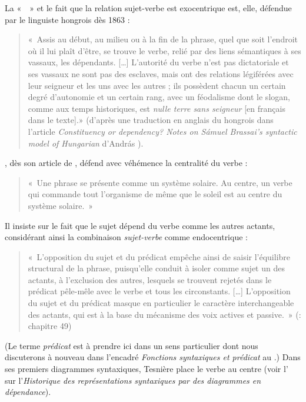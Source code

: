 {    La «~~» et le fait que la relation sujet-verbe est exocentrique est, elle, défendue par le linguiste hongrois  dès 1863 : 
    \begin{quote}«~Assis au début, au milieu ou à la fin de la phrase, quel que soit l’endroit où il lui plaît d’être, se trouve le verbe, relié par des liens sémantiques à ses vassaux, les dépendants. […] L’autorité du verbe n’est pas dictatoriale et ses vassaux ne sont pas des esclaves, mais ont des relations légiférées avec leur seigneur et les uns avec les autres ; ils possèdent chacun un certain degré d’autonomie et un certain rang, avec un féodalisme dont le slogan, comme aux temps historiques, est \textit{nulle terre sans seigneur} [en français dans le texte].» (d’après une traduction en anglais du hongrois dans l’article \textit{Constituency or dependency? Notes on Sámuel Brassai’s syntactic model of Hungarian} d’András \citealt{imrenyi2013constituency}). \end{quote}

    , dès son article de \citeyear{tesniere1934comment}, défend avec véhémence la centralité du verbe : 
    \begin{quote}«~Une phrase se présente comme un système solaire. Au centre, un verbe qui commande tout l’organisme de même que le soleil est au centre du système solaire.~»\end{quote}
    Il insiste sur le fait que le sujet dépend du verbe comme les autres actants, considérant ainsi la combinaison \textit{sujet-verbe} comme endocentrique : 
    \begin{quote}«~L’opposition du sujet et du prédicat empêche ainsi de saisir l’équilibre structural de la phrase, puisqu’elle conduit à isoler comme sujet un des actants, à l’exclusion des autres, lesquels se trouvent rejetés dans le prédicat pêle-mêle avec le verbe et tous les circonstants. […] L’opposition du sujet et du prédicat masque en particulier le caractère interchangeable des actants, qui est à la base du mécanisme des voix actives et passive.~» (\citeyear{tesniere1959elements}: chapitre 49)\end{quote}
    (Le terme \textit{prédicat} est à prendre ici dans un sens particulier dont nous discuterons à nouveau dans l’encadré \textit{Fonctions syntaxiques et prédicat} au .) Dans ses premiers diagrammes syntaxiques, Tesnière place le verbe au centre (voir l' sur l'\textit{Historique des représentations syntaxiques par des diagrammes en dépendance}).

}
